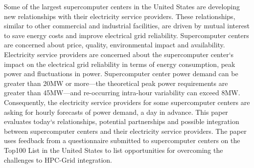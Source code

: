 Some of the largest supercomputer centers in the United States are developing 
new relationships with their electricity service providers. 
These relationships, similar to other commercial and industrial facilities, are 
driven by mutual interest to save energy costs and improve electrical grid reliability.
Supercomputer centers are concerned about price, quality, environmental 
impact and availability.
Electricity service providers are concerned about the supercomputer center`s impact 
on the electrical grid reliability in terms of energy consumption, peak power and fluctuations in power.
Supercomputer center power demand can be greater than 20MW or more---the 
theoretical peak power requirements are greater than 45MW---and re-occurring 
intra-hour variability can exceed 8MW.
Consequently, the electricity service providers for some supercomputer centers
are asking for hourly forecasts of power demand, a day in advance.
This paper evaluates today`s relationships, potential partnerships and possible 
integration between supercomputer centers and their electricity service providers.
The paper uses feedback from a questionnaire submitted to supercomputer centers 
on the Top100 List in the United States to list opportunities for overcoming the 
challenges to HPC-Grid integration.

